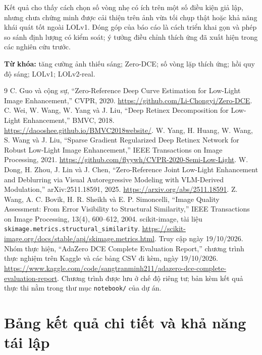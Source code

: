 \documentclass[12pt,a4paper]{article}
\begin{document}
Kết quả cho thấy cách chọn số vòng nhẹ có ích trên một số điều kiện giả lập, nhưng chưa chứng minh được cải thiện trên ảnh vừa tối chụp thật hoặc khả năng khái quát tốt ngoài LOLv1. Đóng góp của báo cáo là cách triển khai gọn và phép so sánh định lượng có kiểm soát; ý tưởng điều chỉnh thích ứng đã xuất hiện trong các nghiên cứu trước.

\textbf{Từ khóa:} tăng cường ảnh thiếu sáng; Zero-DCE; số vòng lặp thích ứng; hồi quy độ sáng; LOLv1; LOLv2-real.
\clearpage
\begingroup\small{}
\tableofcontents
\endgroup
\clearpage
{}

\clearpage
\begin{thebibliography}{9}
 C. Guo và cộng sự, ``Zero-Reference Deep Curve Estimation for Low-Light Image Enhancement,'' CVPR, 2020. \url{https://github.com/Li-Chongyi/Zero-DCE}.
 C. Wei, W. Wang, W. Yang và J. Liu, ``Deep Retinex Decomposition for Low-Light Enhancement,'' BMVC, 2018. \url{https://daooshee.github.io/BMVC2018website/}.
 W. Yang, H. Huang, W. Wang, S. Wang và J. Liu, ``Sparse Gradient Regularized Deep Retinex Network for Robust Low-Light Image Enhancement,'' IEEE Transactions on Image Processing, 2021. \url{https://github.com/flyywh/CVPR-2020-Semi-Low-Light}.
 W. Dong, H. Zhou, J. Lin và J. Chen, ``Zero-Reference Joint Low-Light Enhancement and Deblurring via Visual Autoregressive Modeling with VLM-Derived Modulation,'' arXiv:2511.18591, 2025. \url{https://arxiv.org/abs/2511.18591}.
 Z. Wang, A. C. Bovik, H. R. Sheikh và E. P. Simoncelli, ``Image Quality Assessment: From Error Visibility to Structural Similarity,'' IEEE Transactions on Image Processing, 13(4), 600--612, 2004.
 scikit-image, tài liệu \texttt{skimage.metrics.structural\_similarity}. \url{https://scikit-image.org/docs/stable/api/skimage.metrics.html}. Truy cập ngày 19/10/2026.
 Nhóm thực hiện, ``AdaZero DCE Complete Evaluation Report,'' chương trình thực nghiệm trên Kaggle và các bảng CSV đi kèm, ngày 19/10/2026. \url{https://www.kaggle.com/code/sangtranminh211/adazero-dce-complete-evaluation-report}. Chương trình được lưu ở chế độ riêng tư; bản kèm kết quả thực thi nằm trong thư mục \texttt{notebook/} của dự án.
\end{thebibliography}
\clearpage
\appendix
\section{Bảng kết quả chi tiết và khả năng tái lập}

\end{document}
